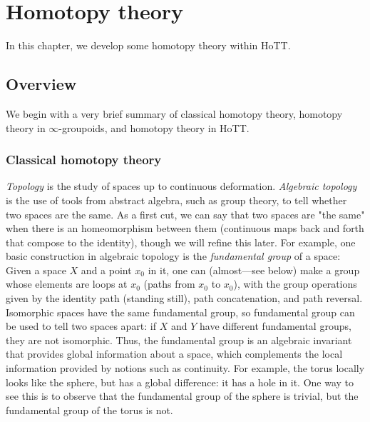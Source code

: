 \chapter{Homotopy theory}
\label{cha:homotopy}

In this chapter, we develop some homotopy theory within HoTT.  

\section{Overview}

We begin with a very brief summary of classical homotopy theory,
homotopy theory in $\infty$-groupoids, and homotopy theory in HoTT.

\subsection{Classical homotopy theory}

\emph{Topology} is the study of spaces up to continuous deformation.
\emph{Algebraic topology} is the use of tools from abstract algebra,
such as group theory, to tell whether two spaces are the same.  As a first
cut, we can say that two spaces are "the same" when there is an
homeomorphism between them (continuous maps back and forth that compose to
the identity), though we will refine this later.  For example, one basic
construction in algebraic topology is the \emph{fundamental group} of a
space: Given a space $X$ and a point $x_0$ in it, one can (almost---see
below) make a group whose elements are loops at $x_0$ (paths from $x_0$
to $x_0$), with the group operations given by the identity path
(standing still), path concatenation, and path reversal.  Isomorphic
spaces have the same fundamental group, so fundamental group can be used
to tell two spaces apart: if $X$ and $Y$ have different fundamental
groups, they are not isomorphic.  Thus, the fundamental group is an
algebraic invariant that provides global information about a space,
which complements the local information provided by notions such as
continuity.  For example, the torus locally looks like the sphere, but
has a global difference: it has a hole in it.  One way to see this is to
observe that the fundamental group of the sphere is trivial, but the
fundamental group of the torus is not.

